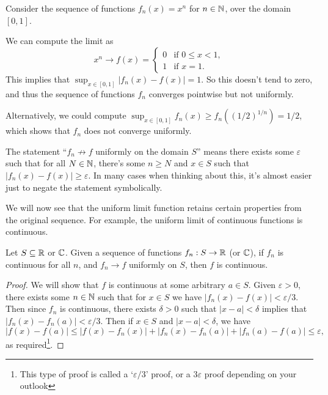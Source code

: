 \documentclass[a4paper]{scrartcl}
\begin{document}
\begin{example}
    Consider the sequence of functions $f_n(x) = x^n$ for $n \in \mathbb{N}$, over the domain $[0, 1]$.

    We can compute the limit as
    $$
    x^n \rightarrow f(x) = \begin{cases}
        0 &\mbox{if } 0 \leq x < 1, \\
        1 &\mbox{if } x = 1.
       \end{cases}
    $$
    This implies that $\sup_{x \in [0, 1]} |f_n(x) - f(x)| = 1$. So this doesn't tend to zero, and thus the sequence of functions $f_n$ converges pointwise but not uniformly.

    Alternatively, we could compute $\sup_{x \in [0, 1]} f_n(x) \geq f_n((1/2)^{1/n}) = 1/2$, which shows that $f_n$ does not converge uniformly.
\end{example}

\begin{remark}
    The statement ``$f_n \not \rightarrow f$ uniformly on the domain $S$'' means there exists some $\varepsilon$ such that for all $N \in \mathbb{N}$, there's some $n \geq N$ and $x \in S$ such that $|f_n(x) - f(x)| \geq \varepsilon$. In many cases when thinking about this, it's almost easier just to negate the statement symbolically.
\end{remark}

We will now see that the uniform limit function retains certain properties from the original sequence. For example, the uniform limit of continuous functions is continuous.

\begin{theorem}
    Let $S \subseteq \mathbb{R}$ or $\mathbb{C}$. Given a sequence of functions $f_n : S \rightarrow \mathbb{R}$ (or $\mathbb{C}$), if $f_n$ is continuous for all $n$, and $f_n \rightarrow f$ uniformly on $S$, then $f$ is continuous.
\end{theorem}
\begin{proof}
    We will show that $f$ is continuous at some arbitrary $a \in S$. Given $\varepsilon > 0$, there exists some $n \in \mathbb{N}$ such that for $x \in S$ we have $|f_n(x) - f(x)| < \varepsilon /3$. Then since $f_n$ is continuous, there exists $\delta > 0$ such that $|x - a| < \delta$ implies that $|f_n(x) - f_n(a)| < \varepsilon / 3$. Then if $x \in S$ and $|x - a| < \delta$, we have
    $$
    |f(x) - f(a)| \leq |f(x) - f_n(x)| + |f_n(x) - f_n(a)| + |f_n(a) - f(a)| \leq \varepsilon,
    $$
    as required\footnote{This type of proof is called a `$\varepsilon/3$' proof, or a $3 \varepsilon$ proof depending on your outlook}.
\end{proof}
\end{document}
